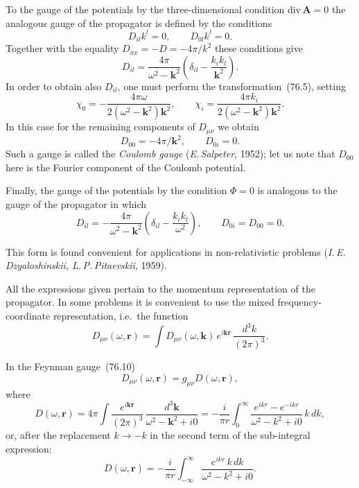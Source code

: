 To the gauge of the potentials by the three-dimensional condition $\mathrm{div}\,\mathbf{A} = 0$ the analogous gauge of the propagator is defined by the conditions
\[
D_{il}k^l = 0,\qquad D_{0l}k^l = 0.
\]
Together with the equality $D_{xx} = -D = -4\pi/k^2$ these conditions give
\begin{equation}
D_{il} = \frac{4\pi}{\omega^2 - \mathbf{k}^2}\left(\delta_{il} - \frac{k_ik_l}{\mathbf{k}^2}\right).
\tag{76.12}
\end{equation}
In order to obtain also $D_{il}$, one must perform the transformation~(76.5), setting
\[
\chi_0 = -\frac{4\pi\omega}{2(\omega^2 - \mathbf{k}^2)\mathbf{k}^2},\qquad \chi_i = \frac{4\pi k_i}{2(\omega^2 - \mathbf{k}^2)\mathbf{k}^2}.
\]
In this case for the remaining components of $D_{\mu\nu}$ we obtain
\begin{equation}
D_{00} = -4\pi/\mathbf{k}^2,\qquad D_{0i} = 0.
\tag{76.13}
\end{equation}
Such a gauge is called the \textit{Coulomb gauge} (\textit{E.\,Salpeter}, 1952); let us note that $D_{00}$ here is the Fourier component of the Coulomb potential.

Finally, the gauge of the potentials by the condition $\Phi = 0$ is analogous to the gauge of the propagator in which
\begin{equation}
D_{il} = -\frac{4\pi}{\omega^2 - \mathbf{k}^2}\left(\delta_{il} - \frac{k_ik_l}{\omega^2}\right),\qquad D_{0i} = D_{00} = 0.
\tag{76.14}
\end{equation}

This form is found convenient for applications in non-relativistic problems (\textit{I.\,E.\,Dzyaloshinskii, L.\,P.\,Pitaevskii}, 1959).

All the expressions given pertain to the momentum representation of the propagator. In some problems it is convenient to use the mixed frequency-coordinate representation, i.e.\ the function
\begin{equation}
D_{\mu\nu}(\omega,\mathbf{r}) = \int D_{\mu\nu}(\omega,\mathbf{k})\,e^{i\mathbf{k}\mathbf{r}}\,\frac{d^3k}{(2\pi)^3}.
\tag{76.15}
\end{equation}

In the Feynman gauge~(76.10)
\[
D_{\mu\nu}(\omega,\mathbf{r}) = g_{\mu\nu}D(\omega,\mathbf{r}),
\]
where
\[
D(\omega,\mathbf{r}) = 4\pi\int\frac{e^{i\mathbf{k}\mathbf{r}}}{(2\pi)^3}\,\frac{d^3\mathbf{k}}{\omega^2 - \mathbf{k}^2 + i0} = -\frac{i}{\pi r}\int_0^\infty\frac{e^{ikr} - e^{-ikr}}{\omega^2 - k^2 + i0}\,k\,dk,
\]
or, after the replacement $k \to -k$ in the second term of the sub-integral expression:
\[
D(\omega,\mathbf{r}) = -\frac{i}{\pi r}\int_{-\infty}^{\infty}\frac{e^{ikr}\,k\,dk}{\omega^2 - k^2 + i0}.
\]

